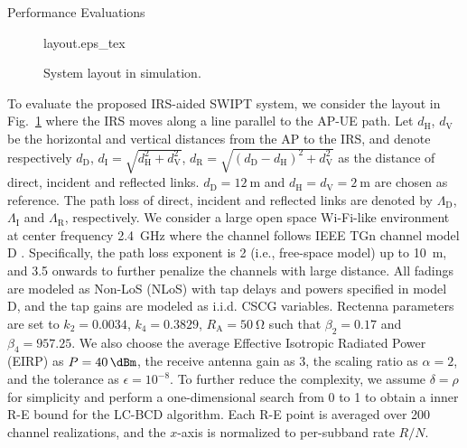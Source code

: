 \documentclass[journal]{IEEEtran}
\begin{document}
	\begin{section}{Performance Evaluations}\label{se:performance_evaluation}
		\begin{figure}[!t]
			\centering
			\def\svgwidth{0.9\columnwidth}
			{layout.eps_tex}
			\caption{System layout in simulation.}
			\label{fi:layout}
		\end{figure}

		To evaluate the proposed IRS-aided SWIPT system, we consider the layout in Fig.~\ref{fi:layout} where the IRS moves along a line parallel to the AP-UE path. Let $d_{\mathrm{H}}$, $d_{\mathrm{V}}$ be the horizontal and vertical distances from the AP to the IRS, and denote respectively $d_{\mathrm{D}}$, $d_{\mathrm{I}}=\sqrt{d_{\mathrm{H}}^2+d_{\mathrm{V}}^2}$, $d_{\mathrm{R}}=\sqrt{(d_{\mathrm{D}}-d_{\mathrm{H}})^2+d_{\mathrm{V}}^2}$ as the distance of direct, incident and reflected links. $d_{\mathrm{D}}=\SI{12}{\meter}$ and $d_{\mathrm{H}}=d_{\mathrm{V}}=\SI{2}{\meter}$ are chosen as reference. The path loss of direct, incident and reflected links are denoted by $\Lambda_{\mathrm{D}}$, $\Lambda_{\mathrm{I}}$ and $\Lambda_{\mathrm{R}}$, respectively. We consider a large open space Wi-Fi-like environment at center frequency \SI{2.4}{\GHz} where the channel follows IEEE TGn channel model D \cite{Erceg2004}. Specifically, the path loss exponent is \num{2} (i.e., free-space model) up to \SI{10}{\meter}, and \num{3.5} onwards to further penalize the channels with large distance. All fadings are modeled as Non-LoS (NLoS) with tap delays and powers specified in model D, and the tap gains are modeled as i.i.d. CSCG variables. Rectenna parameters are set to $k_2=0.0034$, $k_4=0.3829$, $R_{\mathrm{A}}=\SI{50}{\ohm}$ \cite{Clerckx2016a} such that $\beta_2=0.17$ and $\beta_4=957.25$. We also choose the average Effective Isotropic Radiated Power (EIRP) as $P=\SI{40}{\dBm}$, the receive antenna gain as \SI{3}{\dBi}, the scaling ratio as $\alpha=2$, and the tolerance as $\epsilon=10^{-8}$. To further reduce the complexity, we assume $\delta=\rho$ for simplicity and perform a one-dimensional search from \num{0} to \num{1} to obtain a inner R-E bound for the LC-BCD algorithm. Each R-E point is averaged over \num{200} channel realizations, and the $x$-axis is normalized to per-subband rate $R/N$.


\end{section}
\end{document}

